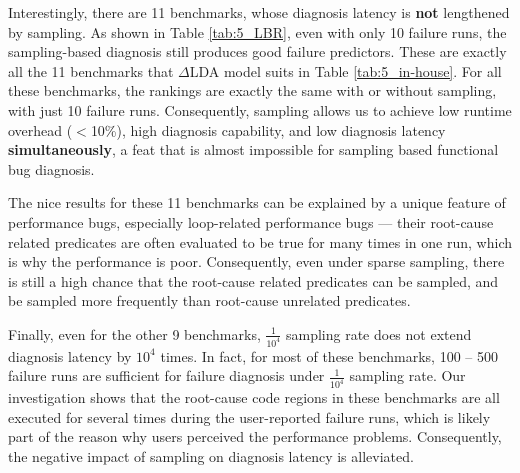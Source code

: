 Interestingly, there are 11 benchmarks, whose diagnosis latency is \textbf{not}
lengthened by sampling. As shown in Table \ref{tab:5_LBR}, even with only
10 failure runs, the sampling-based diagnosis still produces good failure
predictors. These are exactly all the 11 benchmarks that $\Delta$LDA model 
suits in Table \ref{tab:5_in-house}. 
For all these benchmarks,
the rankings are exactly the same with or without
sampling, with just 10 failure runs. Consequently, sampling
allows us to achieve low runtime overhead ($<$10\%), high diagnosis capability,
and low diagnosis latency \textbf{simultaneously}, a feat that is almost 
impossible
for sampling based functional bug diagnosis.

The nice results for these 11 benchmarks can be explained by a unique feature
of performance bugs, especially loop-related
performance bugs --- their root-cause related predicates are often evaluated to 
be true for many times in one run, which is why the performance is poor.
Consequently, even under sparse sampling, there is still a high chance that the
root-cause related predicates can be sampled, and be sampled more frequently
than root-cause unrelated predicates.


Finally, even for the other 9 benchmarks, 
$\frac{1}{10^4}$ sampling rate does not 
extend diagnosis
latency by $10^4$ times. In fact, for most of these benchmarks, 100 -- 500
failure runs are sufficient for failure diagnosis under 
$\frac{1}{10^4}$ sampling
rate. Our investigation shows that the root-cause code regions in these 
benchmarks
are all executed for several times during the user-reported failure runs, 
which
is likely part of the reason why users perceived the performance problems. 
Consequently, the negative impact of sampling on diagnosis latency is
alleviated.


